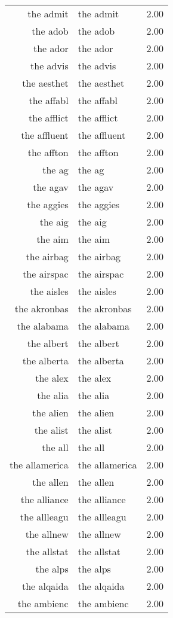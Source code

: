 \begin{table}[ht]
\begin{tabular}{rlr}
  the admit & the admit & 2.00 \\ 
  the adob & the adob & 2.00 \\ 
  the ador & the ador & 2.00 \\ 
  the advis & the advis & 2.00 \\ 
  the aesthet & the aesthet & 2.00 \\ 
  the affabl & the affabl & 2.00 \\ 
  the afflict & the afflict & 2.00 \\ 
  the affluent & the affluent & 2.00 \\ 
  the affton & the affton & 2.00 \\ 
  the ag & the ag & 2.00 \\ 
  the agav & the agav & 2.00 \\ 
  the aggies & the aggies & 2.00 \\ 
  the aig & the aig & 2.00 \\ 
  the aim & the aim & 2.00 \\ 
  the airbag & the airbag & 2.00 \\ 
  the airspac & the airspac & 2.00 \\ 
  the aisles & the aisles & 2.00 \\ 
  the akronbas & the akronbas & 2.00 \\ 
  the alabama & the alabama & 2.00 \\ 
  the albert & the albert & 2.00 \\ 
  the alberta & the alberta & 2.00 \\ 
  the alex & the alex & 2.00 \\ 
  the alia & the alia & 2.00 \\ 
  the alien & the alien & 2.00 \\ 
  the alist & the alist & 2.00 \\ 
  the all & the all & 2.00 \\ 
  the allamerica & the allamerica & 2.00 \\ 
  the allen & the allen & 2.00 \\ 
  the alliance & the alliance & 2.00 \\ 
  the allleagu & the allleagu & 2.00 \\ 
  the allnew & the allnew & 2.00 \\ 
  the allstat & the allstat & 2.00 \\ 
  the alps & the alps & 2.00 \\ 
  the alqaida & the alqaida & 2.00 \\ 
  the ambienc & the ambienc & 2.00 \\ 

\end{tabular}
\end{table}
